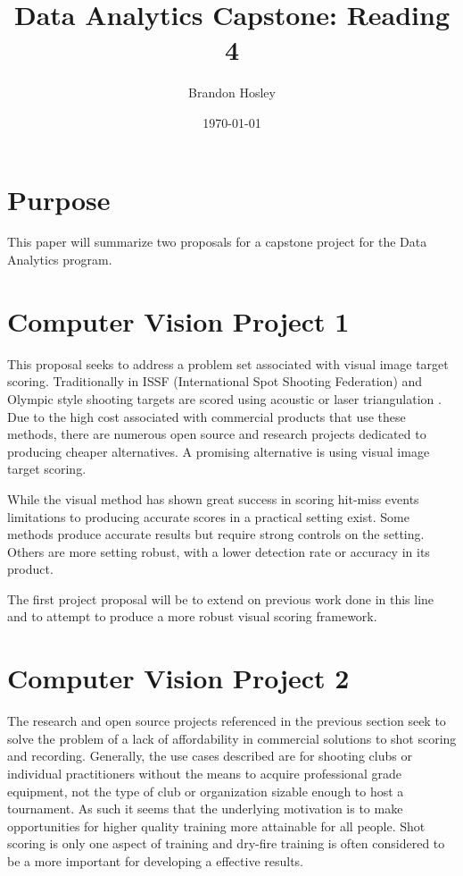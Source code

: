 \documentclass[]{article}
\title{Data Analytics Capstone: Reading 4}
\author{Brandon Hosley}
\date{\today}
\begin{document}
	\maketitle
	
\section{Purpose} 

This paper will summarize two proposals for a capstone project for the Data Analytics program.

\section{Computer Vision Project 1}

This proposal seeks to address a problem set associated with visual image target scoring. Traditionally in ISSF (International Spot Shooting Federation) and Olympic style shooting
targets are scored using acoustic or laser triangulation 
\cite{Anderson2018} \cite{SUIS}.
Due to the high cost associated with commercial products that use these methods, 
there are numerous open source \cite{etarg} \cite{freetarget}
and research projects \cite{Rudzinski2012} \cite{Stenhager2021}
dedicated to producing cheaper alternatives.
A promising alternative is using visual image target scoring.

While the visual method has shown great success in scoring hit-miss events \cite{Ye2011}
limitations to producing accurate scores in a practical setting exist.
Some methods \cite{Rudzinski2012} produce accurate results 
but require strong controls on the setting.
Others \cite{Stenhager2021} are more setting robust, 
with a lower detection rate or accuracy in its product.

The first project proposal will be to extend on previous work done in this line and to  attempt to produce a more robust visual scoring framework.

\section{Computer Vision Project 2}

The research and open source projects referenced in the previous section seek to solve the problem of a lack of affordability in commercial solutions to shot scoring and recording.
Generally, the use cases described are for shooting clubs or individual practitioners without the means to acquire professional grade equipment, not the type of club or organization sizable enough to host a tournament.
As such it seems that the underlying motivation is to make opportunities for higher quality training more attainable for all people.
Shot scoring is only one aspect of training and dry-fire training is often \cite{}
considered to be a more important for developing a effective results.
\end{document}
